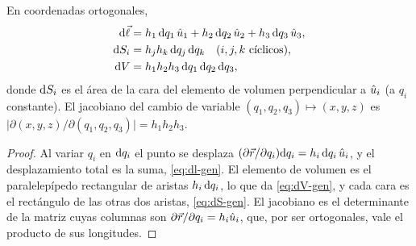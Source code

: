 \begin{proposicion}\label{prop:elementos}
En coordenadas ortogonales,
\begin{align}
  \mathrm{d}\vec{\ell}&=h_1\,\mathrm{d} q_1\,\hat{u}_{1}+h_2\,\mathrm{d} q_2\,\hat{u}_{2}+h_3\,\mathrm{d} q_3\,\hat{u}_{3}, \label{eq:dl-gen}\\
  \mathrm{d} S_i&=h_jh_k\,\mathrm{d} q_j\,\mathrm{d} q_k\quad(i,j,k\ \text{cíclicos}), \label{eq:dS-gen}\\
  \mathrm{d} V&=h_1h_2h_3\,\mathrm{d} q_1\,\mathrm{d} q_2\,\mathrm{d} q_3, \label{eq:dV-gen}
\end{align}
donde $\mathrm{d} S_i$ es el área de la cara del elemento de volumen perpendicular a
$\hat{u}_{i}$ (a $q_i$ constante). El jacobiano del cambio de variable
$(q_1,q_2,q_3)\mapsto(x,y,z)$ es
$\bigl|\partial(x,y,z)/\partial(q_1,q_2,q_3)\bigr|=h_1h_2h_3$.
\end{proposicion}
\begin{proof}
Al variar $q_i$ en $\mathrm{d} q_i$ el punto se desplaza
$(\partial\vec{r}/\partial q_i)\mathrm{d} q_i=h_i\,\mathrm{d} q_i\,\hat{u}_{i}$, y el desplazamiento
total es la suma, \cref{eq:dl-gen}. El elemento de volumen es el paralelepípedo
rectangular de aristas $h_i\,\mathrm{d} q_i$, lo que da \eqref{eq:dV-gen}, y cada cara es
el rectángulo de las otras dos aristas, \cref{eq:dS-gen}. El jacobiano es el
determinante de la matriz cuyas columnas son $\partial\vec{r}/\partial q_i=h_i\hat{u}_{i}$,
que, por ser ortogonales, vale el producto de sus longitudes.
\end{proof}

